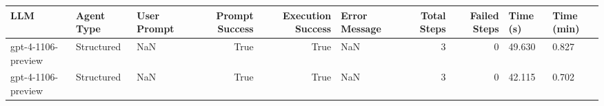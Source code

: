 \begin{tabular}{lllrrlrrll}
\toprule
LLM & Agent Type & User Prompt & Prompt Success & Execution Success & Error Message & Total Steps & Failed Steps & Time (s) & Time (min) \\
\midrule
gpt-4-1106-preview & Structured & NaN & True & True & NaN & 3 & 0 & 49.630 & 0.827 \\
gpt-4-1106-preview & Structured & NaN & True & True & NaN & 3 & 0 & 42.115 & 0.702 \\
\bottomrule
\end{tabular}
